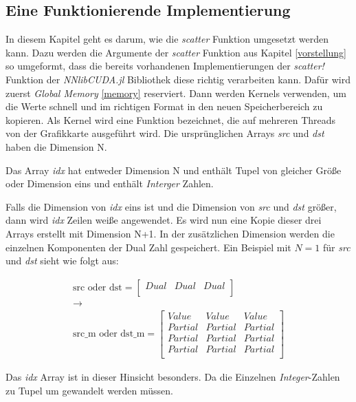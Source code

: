 \subsection{Eine Funktionierende Implementierung} \label{sec:funktional_implementaion}

In diesem Kapitel geht es darum, wie die \textit{scatter} Funktion umgesetzt werden kann.
Dazu werden die Argumente der \textit{scatter} Funktion aus Kapitel \ref{vorstellung} so
umgeformt, 
dass die bereits vorhandenen Implementierungen der \textit{scatter!} Funktion der \textit{NNlibCUDA.jl} \cite{nnlibcuda} Bibliothek 
diese richtig verarbeiten kann.
Dafür wird zuerst \textit{Global Memory} \ref{memory} reserviert. Dann werden Kernels verwenden, 
um die Werte schnell und im richtigen Format in den neuen Speicherbereich zu kopieren.
Als Kernel wird eine Funktion bezeichnet, die auf mehreren Threads von der Grafikkarte ausgeführt wird.
Die ursprünglichen Arrays \textit{src} und \textit{dst} haben die Dimension N.

Das Array \textit{idx} hat entweder Dimension N und enthält Tupel von gleicher Größe
oder Dimension eins und enthält \textit{Interger} Zahlen.

Falls die Dimension von \textit{idx} eins ist und die Dimension von \textit{src}
und \textit{dst} größer, dann wird \textit{idx} Zeilen weiße angewendet.
Es wird nun eine Kopie dieser drei Arrays erstellt mit Dimension N+1.
In der zusätzlichen Dimension werden die einzelnen Komponenten der Dual Zahl gespeichert.
Ein Beispiel mit $N = 1$ für \textit{src} und \textit{dst} sieht wie folgt aus:


\begin{gather}
\text{src oder dst} = 
\begin{bmatrix}
Dual & Dual & Dual\\
\end{bmatrix}\\
\rightarrow\\
\text{src\_m oder dst\_m} = 
\begin{bmatrix}
Value   & Value   & Value   \\
Partial & Partial & Partial \\
Partial & Partial & Partial \\
Partial & Partial & Partial \\
\end{bmatrix}
\end{gather}


Das \textit{idx} Array ist in dieser Hinsicht besonders.
Da die Einzelnen \textit{Integer}-Zahlen zu Tupel um gewandelt werden müssen.

